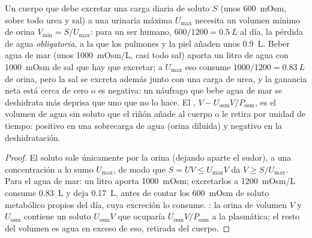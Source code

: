 \begin{proposition}\label{prop:b3:renal-osmoregulation:water}
Un cuerpo que debe excretar una carga diaria de soluto $S$ (unos
\qty{600}{mOsm}, sobre todo urea y sal) a una  urinaria
máxima $U_{\max}$ necesita un volumen mínimo de orina
$V_{\min} = S/U_{\max}$: para un ser humano, $600/1200 = \qty{0.5}{L}$
al día, la pérdida de agua \emph{obligatoria}, a la que los pulmones y
la piel añaden unos \qty{0.9}{L}. Beber agua de mar (unos
\qty{1000}{mOsm/L}, casi todo sal) aporta un litro de agua con
\qty{1000}{mOsm} de sal que hay que excretar; a $U_{\max}$ eso consume
$1000/1200 = \qty{0.83}{L}$ de orina, pero la sal se excreta además
junto con una carga de urea, y la ganancia neta está cerca de cero o es
negativa: un náufrago que bebe agua de mar se deshidrata más deprisa
que uno que no lo hace. El \emph{},
$V - U_{\text{osm}}V/P_{\text{osm}}$, es el volumen de agua sin soluto
que el riñón añade al cuerpo o le retira por unidad de tiempo: positivo
en una sobrecarga de agua (orina diluida) y negativo en la
deshidratación.
\end{proposition}
\begin{proof}
El soluto sale únicamente por la orina (dejando aparte el sudor), a una
concentración a lo sumo $U_{\max}$, de modo que $S = U V \le U_{\max}V$
da $V \ge S/U_{\max}$. Para el agua de mar: un litro aporta
\qty{1000}{mOsm}; excretarlos a \qty{1200}{mOsm/L} consume
\qty{0.83}{L} y deja \qty{0.17}{L}, antes de contar los
\qty{600}{mOsm} de soluto metabólico propios del día, cuya excreción lo
consume. : la orina de volumen $V$ y
 $U_{\text{osm}}$ contiene un soluto $U_{\text{osm}}V$ que
ocuparía $U_{\text{osm}}V/P_{\text{osm}}$ a la  plasmática;
el resto del volumen es agua en exceso de eso, retirada del cuerpo.
\end{proof}

